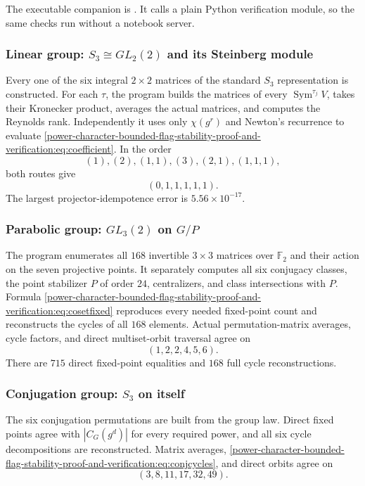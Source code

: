 \documentclass[10pt]{article}
\newcommand{\Sym}{\operatorname{Sym}}
\newcommand{\F}{\mathbb F}
\begin{document}
The executable companion is
.
It calls a plain Python verification module, so the same checks run without a
notebook server.

\subsubsection{Linear group: $S_3\cong GL_2(2)$ and its Steinberg module}

Every one of the six integral $2\times2$ matrices of the standard $S_3$
representation is constructed.  For each $\tau$, the program builds the
matrices of every $\Sym^{\tau_j}V$, takes their Kronecker product, averages the
actual matrices, and computes the Reynolds rank.  Independently it uses only
$\chi(g^r)$ and Newton's recurrence to evaluate \eqref{power-character-bounded-flag-stability-proof-and-verification:eq:coefficient}.  In
the order
\[
(1),(2),(1,1),(3),(2,1),(1,1,1),
\]
both routes give
\[
(0,1,1,1,1,1).
\]
The largest projector-idempotence error is $5.56\times10^{-17}$.

\subsubsection{Parabolic group: $GL_3(2)$ on $G/P$}

The program enumerates all $168$ invertible $3\times3$ matrices over $\F_2$
and their action on the seven projective points.  It separately computes all
six conjugacy classes, the point stabilizer $P$ of order $24$, centralizers,
and class intersections with $P$.  Formula \eqref{power-character-bounded-flag-stability-proof-and-verification:eq:cosetfixed} reproduces
every needed fixed-point count and reconstructs the cycles of all $168$
elements.  Actual permutation-matrix averages, cycle factors, and direct
multiset-orbit traversal agree on
\[
(1,2,2,4,5,6).
\]
There are $715$ direct fixed-point equalities and $168$ full cycle
reconstructions.

\subsubsection{Conjugation group: $S_3$ on itself}

The six conjugation permutations are built from the group law.  Direct fixed
points agree with $|C_G(g^d)|$ for every required power, and all six cycle
decompositions are reconstructed.  Matrix averages, \eqref{power-character-bounded-flag-stability-proof-and-verification:eq:conjcycles},
and direct orbits agree on
\[
(3,8,11,17,32,49).
\]
\end{document}
